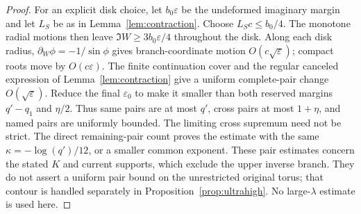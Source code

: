 \documentclass[11pt]{article}
\numberwithin{equation}{section}
\theoremstyle{definition}
\newcommand{\eps}{\varepsilon}
\begin{document}
\begin{proof}
For an explicit disk choice, let \(b_0\eps\) be the
undeformed imaginary margin and let \(L_S\) be as in
Lemma~\ref{lem:contraction}. Choose \(L_Sc\le b_0/4\).
The monotone radial motions then leave \(\Im W\ge3b_0\eps/4\)
throughout the disk. Along each disk radius,
\(\partial_W\phi=-1/\sin\phi\) gives branch-coordinate motion
\(O(c\sqrt\eps)\); compact roots move by \(O(c\eps)\).
The finite continuation cover and the regular canceled expression
of Lemma~\ref{lem:contraction} give a uniform complete-pair change
\(O(\sqrt\eps)\). Reduce the final \(\eps_0\) to make it
smaller than both reserved margins \(q'-q_1\) and \(\eta/2\).
Thus same pairs are at most \(q'\), cross pairs at most
\(1+\eta\), and named pairs are uniformly bounded.
The limiting cross supremum need not be strict. The direct
remaining-pair count proves the estimate with the same
\(\kappa=-\log(q')/12\), or a smaller common exponent.
These pair estimates concern the stated \(K\) and current
supports, which exclude the upper inverse branch. They do not
assert a uniform pair bound on the unrestricted original torus;
that contour is handled separately in Proposition~\ref{prop:ultrahigh}.
No large-\(\lambda\) estimate is used here.
\end{proof}
\end{document}
